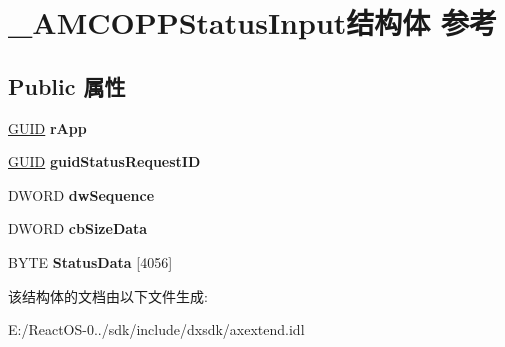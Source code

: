 \hypertarget{struct___a_m_c_o_p_p_status_input}{}\section{\+\_\+\+A\+M\+C\+O\+P\+P\+Status\+Input结构体 参考}
\label{struct___a_m_c_o_p_p_status_input}
\subsection*{Public 属性}
\begin{DoxyCompactItemize}
\item 
\mbox{\label{struct___a_m_c_o_p_p_status_input_aaa6f7848ed07d4aae9eaa566627e8ef0}} 
\hyperlink{interface_g_u_i_d}{G\+U\+ID} {\bfseries r\+App}
\item 
\mbox{\label{struct___a_m_c_o_p_p_status_input_a8fa8f77d585adffbc6368d7a39548f35}} 
\hyperlink{interface_g_u_i_d}{G\+U\+ID} {\bfseries guid\+Status\+Request\+ID}
\item 
\mbox{\label{struct___a_m_c_o_p_p_status_input_a8ebfd626ff9f39768580e0aa3b7c3d3f}} 
D\+W\+O\+RD {\bfseries dw\+Sequence}
\item 
\mbox{\label{struct___a_m_c_o_p_p_status_input_a1caf74317168c0c1307be2a7acf7058a}} 
D\+W\+O\+RD {\bfseries cb\+Size\+Data}
\item 
\mbox{\label{struct___a_m_c_o_p_p_status_input_a9ffb647c4b26643b0eef4322c58ceaed}} 
B\+Y\+TE {\bfseries Status\+Data} \mbox{[}4056\mbox{]}
\end{DoxyCompactItemize}


该结构体的文档由以下文件生成\+:\begin{DoxyCompactItemize}
\item 
E\+:/\+React\+O\+S-\/0../sdk/include/dxsdk/axextend.\+idl\end{DoxyCompactItemize}

